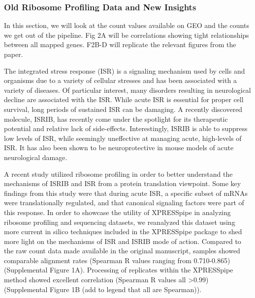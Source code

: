 \documentclass[11pt, a4paper, oneside]{article}
\begin{document}
\subsubsection{Old Ribosome Profiling Data and New Insights}
In this section, we will look at the count values available on GEO and the counts we get out of the pipeline. Fig 2A will be correlations showing tight relationships between all mapped genes. F2B-D will replicate the relevant figures from the paper.

The integrated stress response (ISR) is a signaling mechanism used by cells and organisms due to a variety of cellular stresses and has been associated with a variety of diseases. Of particular interest, many disorders resulting in neurological decline are associated with the ISR.  While acute ISR is essential for proper cell survival, long periods of sustained ISR can be damaging. A recently discovered molecule, ISRIB, has recently come under the spotlight for its therapeutic potential and relative lack of side-effects. Interestingly, ISRIB is able to suppress low levels of ISR, while seemingly uneffective at managing acute, high-levels of ISR. It has also been shown to be neuroprotective in mouse models of acute neurological damage.

A recent study utilized ribosome profiling in order to better understand the mechanisms of ISRIB and ISR from a protein translation viewpoint. Some key findings from this study were that during acute ISR, a specific subset of mRNAs were translationally regulated, and that canonical signaling factors were part of this response. In order to showcase the utility of XPRESSpipe in analyzing ribosome profiling and sequencing datasets, we reanalyzed this dataset using more current in silico techniques included in the XPRESSpipe package to shed more light on the mechanisms of ISR and ISRIB mode of action. Compared to the raw count data made available in the original manuscript, samples showed comparable alignment rates (Spearman R values ranging from 0.710-0.865) (Supplemental Figure 1A). Processing of replicates within the XPRESSpipe method showed excellent correlation (Spearman R values all \textgreater 0.99)  (Supplemental Figure 1B (add to legend that all are Spearman)).
\end{document}
